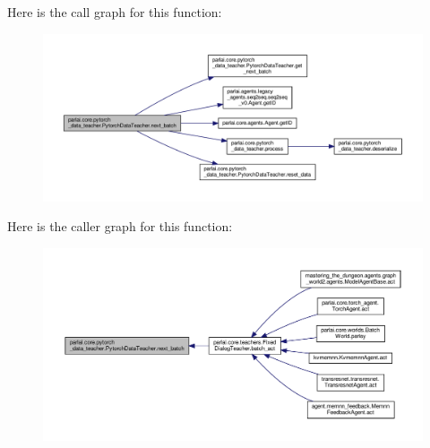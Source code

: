 Here is the call graph for this function\+:
\nopagebreak
\begin{figure}[H]
\begin{center}
\leavevmode
\includegraphics[width=350pt]{classparlai_1_1core_1_1pytorch__data__teacher_1_1PytorchDataTeacher_aa4e63cd7dd1a904a8424a096f7ca1f63_cgraph}
\end{center}
\end{figure}
Here is the caller graph for this function\+:
\nopagebreak
\begin{figure}[H]
\begin{center}
\leavevmode
\includegraphics[width=350pt]{classparlai_1_1core_1_1pytorch__data__teacher_1_1PytorchDataTeacher_aa4e63cd7dd1a904a8424a096f7ca1f63_icgraph}
\end{center}
\end{figure}
\mbox{\label{classparlai_1_1core_1_1pytorch__data__teacher_1_1PytorchDataTeacher_a62003fefcf480fb16038acb7e40b4f15}} 
